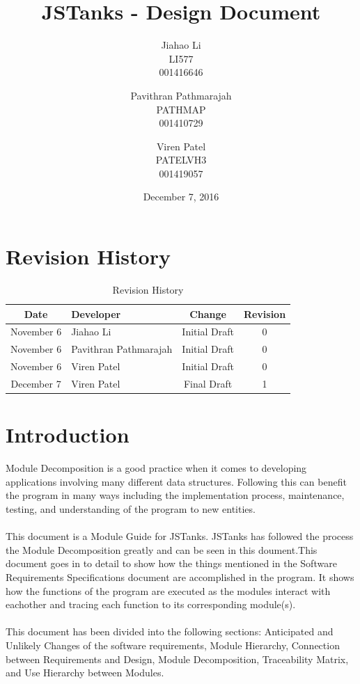 \documentclass{article}
\begin{document}
\newpage
\title{JSTanks - Design Document}
\date{December 7, 2016}
\author{Jiahao Li\\LI577\\001416646\and Pavithran Pathmarajah\\PATHMAP\\
001410729 \and Viren Patel\\PATELVH3\\001419057}

\maketitle

\newpage
{}
\tableofcontents

\newpage
\section{Revision History}
\begin{table}[H]
\caption{Revision History}
	\begin{tabularx}{\textwidth}{cXcc}
		\toprule
		Date & Developer & Change&Revision\\
		\midrule
		November 6&Jiahao Li &Initial Draft&0 \\
		November 6&Pavithran Pathmarajah &Initial Draft&0\\
		November 6&Viren Patel  &Initial Draft&0\\
		December 7&Viren Patel &Final Draft&1\\
	\end{tabularx}
\end{table}

\section{Introduction}
Module Decomposition is a good practice when it comes to developing applications involving many different data structures. Following this can benefit the program in many ways including the implementation process, maintenance, testing, and understanding of the program to new entities.\\ \\
This document is a Module Guide for JSTanks. JSTanks has followed the process the Module Decomposition greatly and can be seen in this doument.This document goes in to detail to show how the things mentioned in the Software Requirements Specifications document are accomplished in the program. It shows how the functions of the program are executed as the modules interact with eachother and tracing each function to its corresponding module(s). \\ \\
This document has been divided into the following sections: Anticipated and Unlikely Changes of the software requirements, Module Hierarchy, Connection between Requirements and Design, Module Decomposition, Traceability Matrix, and Use Hierarchy between Modules.
\end{document}
